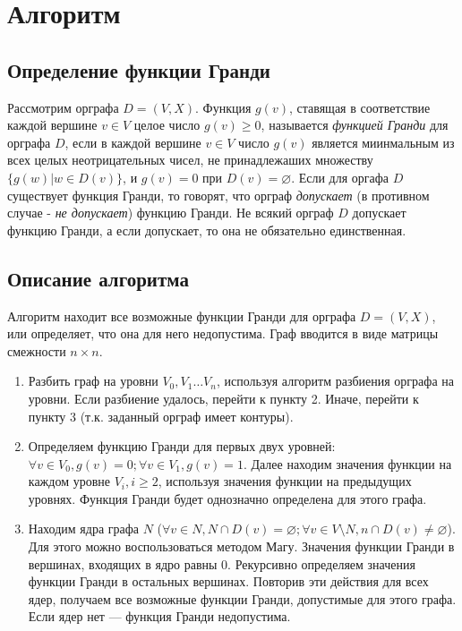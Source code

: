 \documentclass[12pt, letterpaper, titlepage]{article}
\let\emptyset\varnothing
\begin{document}
\section{Алгоритм}
\subsection{Определение функции Гранди}
Рассмотрим орграфа $D = (V, X)$. Функция $g(v)$, ставящая в соответствие каждой
вершине $v \in V$ целое число $g(v) \geq 0$, называется \emph{функцией Гранди} для
орграфа $D$, если в каждой вершине $v \in V$ число $g(v)$ является миинмальным из всех
целых неотрицательных чисел, не принадлежаших множеству $\{g(w) | w \in D(v)\}$, и
$g(v)=0$ при $D(v)=\emptyset$.
Если для оргафа $D$ существует функция Гранди, то говорят, что орграф \emph{допускает}
(в противном случае - \emph{не допускает}) функцию Гранди.
Не всякий орграф $D$ допускает функцию Гранди, а если допускает, то она не обязательно единственная.
\subsection{Описание алгоритма}
Алгоритм находит все возможные функции Гранди для орграфа $D=(V,X)$, или определяет, что она для него недопустима.
Граф вводится в виде матрицы смежности $n \times n$.

\begin{enumerate}
    \item Разбить граф на уровни $V_0, V_1\dots V_n$, используя алгоритм разбиения орграфа на уровни.
    Если разбиение удалось, перейти к пункту 2. Иначе, перейти к пункту 3 (т.к. заданный орграф имеет контуры).
    \item Определяем функцию Гранди для первых двух уровней: $\forall v \in V_0, g(v)=0; \forall v \in V_1, g(v)=1$.
    Далее находим значения функции на каждом уровне $V_i, i\geq 2$, используя значения функции на предыдущих уровнях.
    Функция Гранди будет однозначно определена для этого графа.
    \item Находим ядра графа $N$ ($\forall v \in N,N\cap D(v)=\emptyset;\forall v \in V \setminus N, n\cap D(v) \neq \emptyset$). Для этого можно воспользоваться методом Магу. 
    Значения функции Гранди в вершинах, входящих в ядро равны 0. Рекурсивно определяем значения
    функции Гранди в остальных вершинах. Повторив эти действия для всех ядер, получаем все возможные функции Гранди, допустимые для этого графа.
    Если ядер нет --- функция Гранди недопустима.
\end{enumerate}
\end{document}
